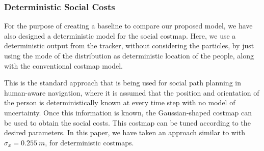\subsubsection{Deterministic Social Costs}
For the purpose of creating a baseline to compare our proposed model, we have also designed a deterministic model for the social costmap. 
Here, we use a deterministic output from the tracker, without considering the particles, by just using the mode of the distribution as deterministic location of the people, along with the conventional costmap model. 


This is the standard approach that is being used for social path planning in human-aware navigation, where it is assumed that the position and orientation of the person is deterministically known at every time step with no model of uncertainty. Once this information is known, the Gaussian-shaped costmap can be used to obtain the social costs. This costmap can be tuned according to the desired parameters. In this paper, we have taken an approach similar to \cite{gomez2013social} with ${\sigma}_{x} = 0.255\ m$, for deterministic costmaps. 


 



